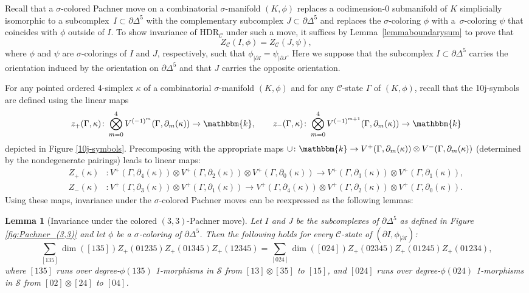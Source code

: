 \documentclass[a4paper, oneside]{amsart}
\numberwithin{equation}{subsection}
\theoremstyle{referencedlemma}
\theoremstyle{plain} %
\newtheorem{lem}[equation]{Lemma}
\theoremstyle{remark}
\begin{document}
Recall that a $\sigma$-colored Pachner move on a combinatorial $\sigma$-manifold $(K,\phi)$ replaces a codimension-0 submanifold of
 $K$ simplicially isomorphic to a subcomplex~$I \subset \partial \Delta^5$ with the complementary subcomplex $J \subset \partial \Delta^5$ and replaces the $\sigma$-coloring $\phi$ with a~$\sigma$-coloring $\psi$ that coincides with $\phi$ outside of $I$. To show invariance of $\mathrm{HDR}_\mathcal{C}$ under such a move, it suffices by Lemma~\ref{lemmaboundarysum} to prove that
\begin{equation*}
Z_\mathcal{C}(I, \phi) = Z_\mathcal{C}(J,\psi),
\end{equation*}
where $\phi$ and $\psi$ are $\sigma$-colorings of $I$ and $J$, respectively, such that $\phi_{\vert \partial I} = \psi_{\vert \partial J}$. Here we suppose that the sub\-complex $I \subset \partial \Delta^5$ carries the orientation induced by the orientation on $\partial \Delta^5$ and that $J$ carries the opposite orientation. 

For any pointed ordered 4-simplex $\kappa$ of a combinatorial $\sigma$-manifold $(K,\phi)$ and for any $\mathcal{C}$-state $\Gamma$ of $(K,\phi)$, recall that the 10j-symbols are defined using the linear maps
$$
z_+(\Gamma, \kappa) \colon \bigotimes_{m = 0}^4 V^{(-1)^m}(\Gamma, \partial_m(\kappa)) \to \mathbbm{k},\quad \quad z_-(\Gamma, \kappa) \colon \bigotimes_{m = 0}^4 V^{(-1)^{m+1}}(\Gamma, \partial_m(\kappa)) \to \mathbbm{k}
$$
depicted in Figure \ref{10j-symbols}. Precomposing with the appropriate maps $\cup \colon \mathbbm{k} \to V^+(\Gamma, \partial_m(\kappa)) \otimes V^-(\Gamma, \partial_m(\kappa))$ (determined by the nondegenerate pairings) leads to linear maps:
\begin{align*}
Z_+(\kappa) &\colon V^+(\Gamma, \partial_4(\kappa)) \otimes V^+(\Gamma, \partial_2(\kappa)) \otimes V^+(\Gamma, \partial_0(\kappa)) \to V^+(\Gamma, \partial_3(\kappa)) \otimes V^+(\Gamma, \partial_1(\kappa)),\\
Z_-(\kappa) &\colon V^+(\Gamma, \partial_3(\kappa)) \otimes V^+(\Gamma, \partial_1(\kappa)) \to V^+(\Gamma, \partial_4(\kappa)) \otimes V^+(\Gamma, \partial_2(\kappa)) \otimes V^+(\Gamma, \partial_0(\kappa)).
\end{align*}
Using these maps, invariance under the $\sigma$-colored Pachner moves can be reexpressed as the following lemmas:

\begin{lem}[Invariance under the colored $(3,3)$-Pachner move]\label{Lemma_Pachner_(3,3)}
Let $I$ and $J$ be the subcomplexes of $\partial \Delta^5$ as defined in Figure \ref{fig:Pachner_(3,3)} and let $\phi$ be a $\sigma$-coloring of $\partial \Delta^5$. Then the following holds for every $\mathcal{C}$-state of $(\partial I,\phi_{\vert \partial I})$:
\begin{equation*}
\sum_{[135]} \dim([135]) Z_+(01235)Z_+(01345)Z_+(12345) = \sum_{[024]} \dim([024])Z_+(02345)Z_+(01245)Z_+(01234),
\end{equation*}
where $[135]$ runs over degree-$\phi(135)$ 1-morphisms in $\mathcal{S}$ from $[13]\otimes [35]$ to $[15]$, and $[024]$ runs over degree-$\phi(024)$ 1-morphisms in $\mathcal{S}$ from $[02]\otimes [24]$ to $[04]$. 
\end{lem}
\end{document}

